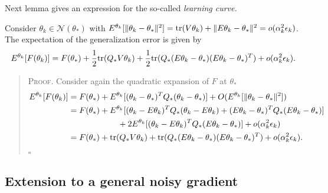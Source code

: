 \documentclass[12pt]{article}
\begin{document}

\noindent
Next lemma gives an expression for the so-called \emph{learning curve.} 
\begin{lemma}
\label{lemm:murat3}
Consider $\theta_k\in\mathcal{N}(\theta_\ast)$ with 
$E^{\theta_k}[\|\theta_k-\theta_\ast\|^2]=\mbox{tr}(V\theta_k)+\|E\theta_k-\theta_\ast\|^2=o(\alpha_k^2\epsilon_k)$. The expectation of the generalization error is given by
\[
 E^{\theta_k}[F(\theta_k)] = F(\theta_\ast) + \frac{1}{2}\mbox{tr}(Q_\ast V\theta_k) + \frac{1}{2}\mbox{tr}(Q_\ast(E\theta_k-\theta_\ast)(E\theta_k-\theta_\ast)^T)+o(\alpha_k^2\epsilon_k).
\]
\end{lemma}

\footnotesize
\begin{quote}
\textsc{Proof.} Consider again the quadratic expansion of $F$ at $\theta_\ast$
\begin{align*}
 E^{\theta_k}[F(\theta_k)] &= F(\theta_\ast) + E^{\theta_k}[(\theta_k-\theta_\ast)^TQ_\ast(\theta_k-\theta_\ast)] + O(E^{\theta_k}[\|\theta_k-\theta_\ast\|^2])\\
 &=F(\theta_\ast) + E^{\theta_k}[(\theta_k-E\theta_k)^TQ_\ast(\theta_k-E\theta_k)+(E\theta_k-\theta_\ast)^TQ_\ast(E\theta_k-\theta_\ast)]\\
 &\qquad\qquad\qquad+2E^{\theta_k}[(\theta_k-E\theta_k)^TQ_\ast(E\theta_k-\theta_\ast)]+o(\alpha_k^2\epsilon_k)\\
 &=F(\theta_\ast) + \mbox{tr}(Q_\ast V\theta_k)+\mbox{tr}(Q_\ast(E\theta_k-\theta_\ast)(E\theta_k-\theta_\ast)^T)+o(\alpha_k^2\epsilon_k).
\end{align*}
\begin{flushright}$\square$\end{flushright}
\end{quote}
\normalsize


\bigskip

\subsection{Extension to a general noisy gradient}
\end{document}
